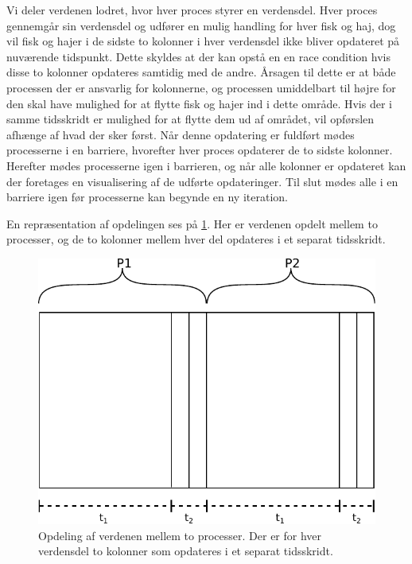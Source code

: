 Vi deler verdenen lodret, hvor hver proces styrer en verdensdel. Hver proces 
gennemgår sin verdensdel og udfører en mulig handling for hver fisk og haj, dog 
vil fisk og hajer i de sidste to kolonner i hver verdensdel ikke bliver 
opdateret på nuværende tidspunkt. Dette skyldes at der kan opstå en en race 
condition hvis disse to kolonner opdateres samtidig med de andre. Årsagen til 
dette er at både processen der er ansvarlig for kolonnerne, og processen 
umiddelbart til højre for den skal have mulighed for at flytte fisk og hajer 
ind i dette område. Hvis der i samme tidsskridt er mulighed for at flytte dem 
ud af området, vil opførslen afhænge af hvad der sker først.  Når denne 
opdatering er fuldført mødes processerne i en barriere, hvorefter hver proces 
opdaterer de to sidste kolonner. Herefter mødes processerne igen i barrieren, 
og når alle kolonner er opdateret kan der foretages en visualisering af de 
udførte opdateringer. Til slut mødes alle i en barriere igen før processerne 
kan begynde en ny iteration.

En repræsentation af opdelingen ses på \cref{fig:wator}. Her er verdenen 
opdelt mellem to processer, og de to kolonner mellem hver del opdateres i et 
separat tidsskridt.  

\begin{figure}
 \begin{center}
  \includegraphics[scale=0.75]{images/wator}
  \caption{Opdeling af verdenen mellem to processer. Der er for hver verdensdel 
  to kolonner som opdateres i et separat tidsskridt.}
  \label{fig:wator}
  \end{center}
\end{figure}


